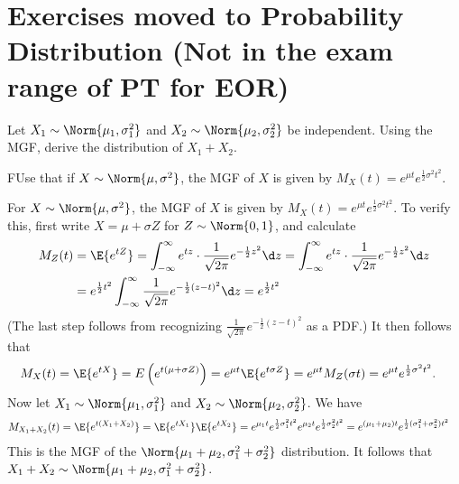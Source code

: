 	
\section{Exercises moved to Probability Distribution (Not in the exam range of PT for EOR)}	
	\begin{exercise}\label{ex:chap06:01}
		Let $X_1\sim \Norm{\mu_1, \sigma_1^2}$ and	$X_2\sim \Norm{\mu_2, \sigma_2^2}$ be independent. Using the MGF, derive the distribution of $X_1 + X_2$.
		\begin{hint}
			FUse that if $X \sim \Norm{\mu, \sigma^2}$, the MGF of $X$ is given by $M_X(t) = e^{\mu t} e^{\frac{1}{2} \sigma^2 t^2}$.
		\end{hint}
		\begin{solution}
			For $X \sim \Norm{\mu, \sigma^2}$, the MGF of $X$ is given by $M_X(t) = e^{\mu t} e^{\frac{1}{2} \sigma^2 t^2}$. To verify this, first write $X = \mu + \sigma Z$ for $Z \sim \Norm{0,1}$, and calculate
			\begin{align*}
				M_Z(t) & = \E{e^{tZ}} = \int_{-\infty}^{\infty} e^{tz} \cdot \frac{1}{\sqrt{2 \pi}} e^{-\frac{1}{2} z^2} \d z = \int_{-\infty}^{\infty} e^{tz} \cdot \frac{1}{\sqrt{2 \pi}} e^{-\frac{1}{2} z^2} \d z \\
				& = e^{\frac{1}{2} t^2} \int_{-\infty}^{\infty} \frac{1}{\sqrt{2 \pi}} e^{-\frac{1}{2} (z - t)^2} \d z = e^{\frac{1}{2} t^2}
			\end{align*}
			(The last step follows from recognizing $\frac{1}{\sqrt{2 \pi}} e^{-\frac{1}{2} (z - t)^2}$ as a PDF.) It then follows that
			\begin{align*}
				M_X(t) & = \E{e^{tX}} = E\left(e^{t(\mu + \sigma Z)}\right) = e^{\mu t} \E{e^{t \sigma Z}} = e^{\mu t} M_Z(\sigma t) = e^{\mu t} e^{\frac{1}{2} \sigma^2 t^2}.
			\end{align*}
			Now let $X_1\sim \Norm{\mu_1, \sigma_1^2}$ and $X_2\sim \Norm{\mu_2, \sigma_2^2}$. We have
			\begin{align*}
				M_{X_1 + X_2}(t) & = \E{e^{t(X_1 + X_2)}} = \E{e^{t X_1}} \E{e^{t X_2}} = e^{\mu_1 t} e^{\frac{1}{2} \sigma_1^2 t^2} e^{\mu_2 t} e^{\frac{1}{2} \sigma_2^2 t^2} = e^{(\mu_1 + \mu_2) t} e^{\frac{1}{2} (\sigma_1^2 + \sigma_2^2) t^2}
			\end{align*}
			This is the MGF of the $\Norm{\mu_1 + \mu_2, \sigma_1^2 + \sigma_2^2}$ distribution. It follows that $X_1 + X_2 \sim \Norm{\mu_1 + \mu_2, \sigma_1^2 + \sigma_2^2}$.
		\end{solution}
	\end{exercise}
	

